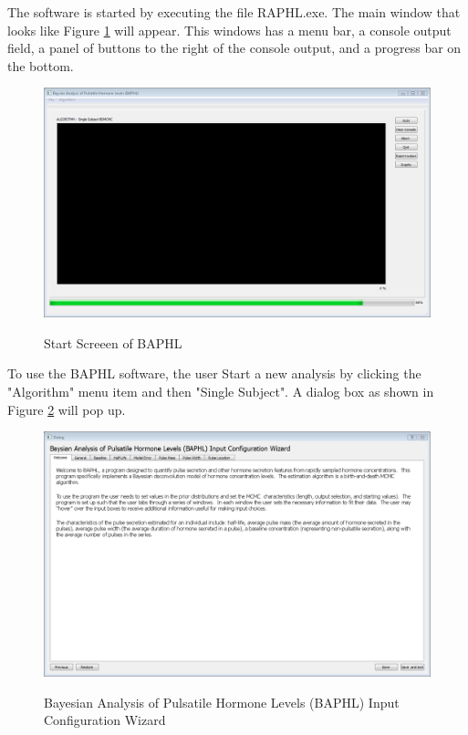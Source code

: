 \documentclass[11pt]{book}
\begin{document}
The software is started by executing the file RAPHL.exe.  The main window that looks like Figure \ref{startscreen} will appear.  This windows has a menu bar, a console output field, a panel of buttons to the right of the console output, and a progress bar on the bottom.
\begin{figure}
  \centering
  \includegraphics[width=\textwidth]{start.PNG}\\
  \caption{Start Screeen of BAPHL}\label{startscreen}
\end{figure}
To use the BAPHL software, the user
Start a new analysis by clicking the "Algorithm" menu item and then "Single Subject".  A dialog box as shown in Figure \ref{singlesubject} will pop up.
\begin{figure}
  \centering
  \includegraphics[width=\textwidth]{singlesubject.PNG}\\
  \caption{Bayesian Analysis of Pulsatile Hormone Levels (BAPHL) Input Configuration Wizard}\label{singlesubject}
\end{figure}
\end{document}
